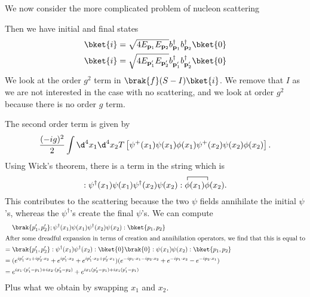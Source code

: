 \documentclass[a4paper]{article}
\begin{document}
\begin{eg}
  We now consider the more complicated problem of nucleon scattering
  \begin{center}
  \end{center}
  Then we have initial and final states
  \begin{align*}
    \bket{i} &= \sqrt{4 E_{\mathbf{p}_1} E_{\mathbf{p}_2}} b_{\mathbf{p}_1}^\dagger b_{\mathbf{p}_2}^\dagger\bket{0}\\
    \bket{i} &= \sqrt{4 E_{\mathbf{p}_1'} E_{\mathbf{p}_2'}} b_{\mathbf{p}_1'}^\dagger b_{\mathbf{p}_2'}^\dagger\bket{0}
  \end{align*}
  We look at the order $g^2$ term in $\brak{f}(S - I)\bket{i}$. We remove that $I$ as we are not interested in the case with no scattering, and we look at order $g^2$ because there is no order $g$ term.

  The second order term is given by
  \[
    \frac{(-ig)^2}{2}\int \d^4 x_1 \d^4 x_2 T\left[\psi^+(x_1) \psi(x_1) \phi(x_1) \psi^+(x_2) \psi(x_2) \phi(x_2)\right].
  \]
  Using Wick's theorem, there is a term in the string which is
  \[
    :\psi^\dagger(x_1) \psi(x_1) \psi^\dagger(x_2) \psi(x_2): \contraction{}{\phi}{(x_1)}{\phi}\phi(x_1)\phi(x_2).
  \]
  This contributes to the scattering because the two $\psi$ fields annihilate the initial $\psi$'s, whereas the $\psi^\dagger$'s create the final $\psi$'s. We can compute
  \begin{align*}
    &\brak{p_1', p_2'} ;\psi^\dagger(x_1) \psi(x_1) \psi^\dagger(x_2) \psi(x_2):\bket{p_1, p_2}\\
    \intertext{After some dreadful expansion in terms of creation and annihilation operators, we find that this is equal to}
    ={}&\brak{p_1', p_2'}:\psi^\dagger(x_1) \psi^\dagger(x_2):\bket{0} \brak{0}:\psi(x_1) \psi(x_2):\bket{p_1, p_2}\\
    ={}& (e^{ip_1' \cdot x_1 + i p_2' \cdot x_2} + e^{i p_1' \cdot x_2} + e^{ip_1' \cdot x_2 + p_2' \cdot x_1})(e^{-ip_1 \cdot x_1 - i p_2 \cdot x_2} + e^{-i p_1 \cdot x_2} - e^{-ip_2 \cdot x_1})\\
    ={}& e^{ix_1 \cdot (p_1' - p_1) + i x_2 \cdot (p_2' - p_2)} + e^{ix_1(p_2' - p_1) + i x_1 (p_1' - p_1)}
  \end{align*}
  Plus what we obtain by swapping $x_1$ and $x_2$.


\end{eg}
\end{document}
